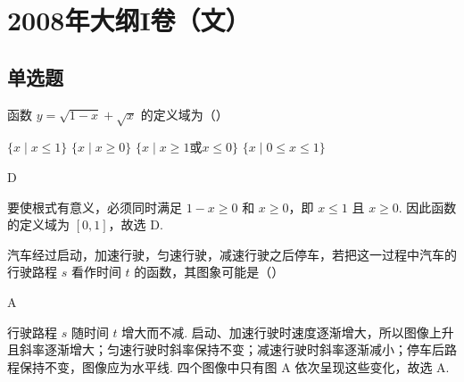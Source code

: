 
\chapter{2008年大纲I卷（文）}

\section{单选题}

\begin{problem}
函数 \( y = \sqrt{1 - x} + \sqrt{x} \) 的定义域为（\quad）

\choices
    {\( \{x \mid x \leqslant 1\} \)}
    {\( \{x \mid x \geqslant 0\} \)}
    {\(\{x \mid x \geqslant 1 \text{或} x \leqslant 0\}\)}
    {\(\{x\mid 0\leqslant x\leqslant 1\}\)}
\end{problem}

\begin{answer}
D
\end{answer}

\begin{solution}
要使根式有意义，必须同时满足 \(1-x\geqslant0\) 和 \(x\geqslant0\)，即 \(x\leqslant1\) 且 \(x\geqslant0\). 因此函数的定义域为 \([0,1]\)，故选 D.
\end{solution}

\begin{problem}
汽车经过启动，加速行驶，匀速行驶，减速行驶之后停车，若把这一过程中汽车的行驶路程 \(s\) 看作时间 \(t\) 的函数，其图象可能是（\quad）

    {}
    {}
    {}
\end{problem}

\begin{answer}
A
\end{answer}

\begin{solution}
行驶路程 \(s\) 随时间 \(t\) 增大而不减. 启动、加速行驶时速度逐渐增大，所以图像上升且斜率逐渐增大；匀速行驶时斜率保持不变；减速行驶时斜率逐渐减小；停车后路程保持不变，图像应为水平线. 四个图像中只有图 A 依次呈现这些变化，故选 A.
\end{solution}


